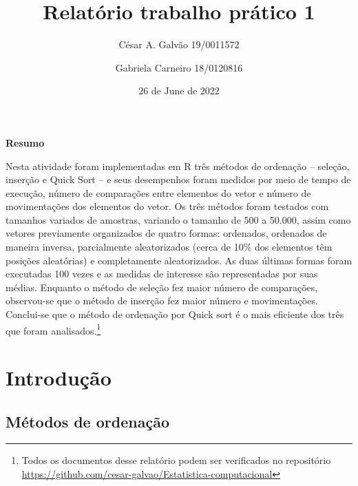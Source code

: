 \documentclass[
]{article}
\title{Relatório trabalho prático 1}
\author{César A. Galvão 19/0011572 \and Gabriela Carneiro 18/0120816}
\date{26 de June de 2022}
\begin{document}
\maketitle

\newpage{}

{
\setcounter{tocdepth}{2}
\tableofcontents
}
\let\oldsection\section
\renewcommand\section{\clearpage\oldsection}

\begin{center} 

\textbf{Resumo} 

\end{center}

Nesta atividade foram implementadas em R três métodos de ordenação --
seleção, inserção e Quick Sort -- e seus desempenhos foram medidos por
meio de tempo de execução, número de comparações entre elementos do
vetor e número de movimentações dos elementos do vetor. Os três métodos
foram testados com tamanhos variados de amostras, variando o tamanho de
500 a 50.000, assim como vetores previamente organizados de quatro
formas: ordenados, ordenados de maneira inversa, parcialmente
aleatorizados (cerca de 10\% dos elementos têm posições aleatórias) e
completamente aleatorizados. As duas últimas formas foram executadas 100
vezes e as medidas de interesse são representadas por suas médias.
Enquanto o método de seleção fez maior número de comparações,
observou-se que o método de inserção fez maior número e movimentações.
Conclui-se que o método de ordenação por Quick sort é o mais eficiente
dos três que foram analisados.\footnote{Todos os documentos desse
  relatório podem ser verificados no repositório
  \url{https://github.com/cesar-galvao/Estatistica-computacional}}

\hypertarget{introduuxe7uxe3o}{%
\section{Introdução}\label{introduuxe7uxe3o}}

\hypertarget{muxe9todos-de-ordenauxe7uxe3o}{%
\subsection{Métodos de ordenação}\label{muxe9todos-de-ordenauxe7uxe3o}}
\end{document}

